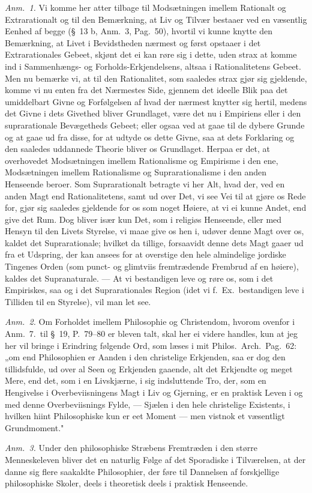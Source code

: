 \documentclass[12pt,a4paper]{book}
\newcommand{\apage}[1]{\marginnote{\footnotesize\textit{[#1]}}}
\begin{document}
{\small\emph{Anm.~1.} Vi komme her atter tilbage til Modsætningen imellem Rationalt
og Extrarationalt og til den Bemærkning, at Liv og Tilvær bestaaer ved en væsentlig
Eenhed af begge (\S~13 b, Anm.~3, Pag.\ 50), hvortil vi kunne knytte den Bemærkning,
at Livet i Bevidstheden nærmest og først opstaaer i det Extrarationales Gebeet,
skjønt det ei kan røre sig i dette, uden strax at komme ind i Sammenhængs- og
Forholds-Erkjendelsens, altsaa i Rationalitetens Gebeet. Men nu bemærke vi, at til
den Rationalitet, som saaledes strax gjør sig gjeldende, komme vi nu enten fra det
Nærmestes Side, gjennem det ideelle Blik paa det umiddelbart Givne og Forfølgelsen af
hvad der nærmest knytter sig hertil, medens det Givne i dets Givethed bliver
Grundlaget, være det nu i Empiriens eller i den suprarationale Bevægetheds Gebeet;
eller ogsaa ved at gaae til de dybere Grunde og at gaae ud fra disse, for at udtyde
os dette Givne, saa at dets Forklaring og den saaledes uddannede Theorie bliver os
Grundlaget. Herpaa er det, at overhovedet Modsætningen imellem Rationalisme og
Empirisme i den ene, Modsætningen imellem Rationalisme og Suprarationalisme i den
anden Henseende beroer. Som Suprarationalt betragte vi her Alt, hvad der, ved en
anden Magt end Rationalitetens, samt ud over Det, vi see Vei til at gjøre os Rede
for, gjør sig saaledes gjeldende for os som noget Høiere, at vi ei kunne Andet, end
give det Rum. Dog bliver især kun Det, som i religiøs Henseende, eller med Hensyn til
den Livets Styrelse, vi maae give os hen i, udøver denne Magt over os, kaldet det
Suprarationale; hvilket da tillige, forsaavidt denne dets Magt gaaer ud fra et
Udspring, der kan ansees for at overstige den hele almindelige jordiske Tingenes
Orden (som punct- og glimtviis fremtrædende Frembrud af en høiere), kaldes det
Supranaturale. --- At vi bestandigen leve og røre os, som i det Empiriskes, saa og i
det Suprarationales Region (idet vi f.\ Ex.\ bestandigen leve i Tilliden til en
Styrelse), vil man let see.\par}

{\small\emph{Anm.~2.} Om Forholdet imellem Philosophie og Christendom, hvorom ovenfor
i Anm.~7.\ til \S~19, P.\ 79--80 er bleven talt, skal her ei videre handles, kun at
jeg her vil bringe i Erindring følgende Ord, som læses i mit Philos.\ Arch.\ Pag.\ 62:
„om end Philosophien er Aanden i den christelige Erkjenden, saa er dog den
tillidsfulde, ud over al Seen og Erkjenden gaaende, alt det Erkjendte og meget Mere,
end det, som i en Livskjærne, i sig indsluttende Tro, der, som en Hengivelse i
Overbeviisningens Magt i Liv og Gjerning, er en praktisk Leven i og med denne
Overbeviisnings Fylde, --- Sjælen i den hele christelige Existents, i hvilken hiint
Philosophiske kun er eet Moment --- men vistnok et væsentligt Grundmoment."\par}
  \apage{85}
{\small

\emph{Anm.~3.} Under den philosophiske Stræbens Fremtræden i den større
Menneskeleven bliver det en naturlig Følge af det Sporadiske i Tilværelsen, at der
danne sig flere saakaldte Philosophier, der føre til Dannelsen af forskjellige
philosophiske Skoler, deels i theoretisk deels i praktisk Henseende.\par}
\end{document}
